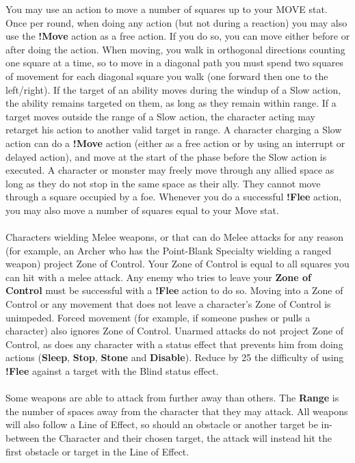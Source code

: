 You may use an action to move a number of squares up to your MOVE stat. 
Once per round, when doing any action (but not during a reaction) you may also use the \textbf{!Move} action as a free action. 
If you do so, you can move either before or after doing the action. 
When moving, you walk in orthogonal directions counting one square at a time, so to move in a diagonal path you must spend two squares of movement for each diagonal square you walk (one forward then one to the left/right).
If the target of an ability moves during the windup of a Slow action, the ability remains targeted on them, as long as they remain within range. 
If a target moves outside the range of a Slow action, the character acting may retarget his action to another valid target in range.
A character charging a Slow action can do a \textbf{!Move} action (either as a free action or by using an interrupt or delayed action), and move at the start of the phase before the Slow action is executed.
A character or monster may freely move through any allied space as long as they do not stop in the same space as their ally. 
They cannot move through a square occupied by a foe. 
Whenever you do a successful \textbf{!Flee} action, you may also move a number of squares equal to your Move stat.
%
\\\\
%
 Characters wielding Melee weapons, or that can do Melee attacks for any reason (for example, an Archer who has the Point-Blank Specialty wielding a ranged weapon) project Zone of Control.
Your Zone of Control is equal to all squares you can hit with a melee attack. 
Any enemy who tries to leave your \textbf{Zone of Control} must be successful with a \textbf{!Flee} action to do so.
Moving into a Zone of Control or any movement that does not leave a character's Zone of Control is unimpeded.
Forced movement (for example, if someone pushes or pulls a character) also ignores Zone of Control. 
Unarmed attacks do not project Zone of Control, as does any character with a status effect that prevents him from doing actions (\textbf{Sleep}, \textbf{Stop}, \textbf{Stone} and \textbf{Disable}). 
Reduce by 25 the difficulty of using \textbf{!Flee} against a target with the Blind status effect.
%
\\\\
%
 Some weapons are able to attack from further away than others. 
The \textbf{Range} is the number of spaces away from the character that they may attack. 
All weapons will also follow a Line of Effect, so should an obstacle or another target be in-between the Character and their chosen target, the attack will instead hit the first obstacle or target in the Line of Effect.\ofrow 
